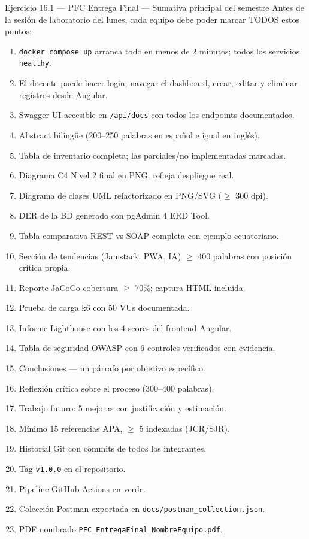 \begin{cajaejercicio}{Ejercicio 16.1 --- PFC Entrega Final --- Sumativa principal del semestre}
Antes de la sesión de laboratorio del lunes, cada equipo debe poder
marcar TODOS estos puntos:

\begin{enumerate}
\item \texttt{docker compose up} arranca todo en menos de 2 minutos;
todos los servicios \texttt{healthy}.
\item El docente puede hacer login, navegar el dashboard, crear,
editar y eliminar registros desde Angular.
\item Swagger UI accesible en \texttt{/api/docs} con todos los
endpoints documentados.
\item Abstract bilingüe (200--250 palabras en español e igual en
inglés).
\item Tabla de inventario completa; las parciales/no implementadas
marcadas.
\item Diagrama C4 Nivel 2 final en PNG, refleja despliegue real.
\item Diagrama de clases UML refactorizado en PNG/SVG ($\geq$ 300 dpi).
\item DER de la BD generado con pgAdmin 4 ERD Tool.
\item Tabla comparativa REST vs SOAP completa con ejemplo ecuatoriano.
\item Sección de tendencias (Jamstack, PWA, IA) $\geq$ 400 palabras
con posición crítica propia.
\item Reporte JaCoCo cobertura $\geq$ 70\%; captura HTML incluida.
\item Prueba de carga k6 con 50 VUs documentada.
\item Informe Lighthouse con los 4 scores del frontend Angular.
\item Tabla de seguridad OWASP con 6 controles verificados con
evidencia.
\item Conclusiones --- un párrafo por objetivo específico.
\item Reflexión crítica sobre el proceso (300--400 palabras).
\item Trabajo futuro: 5 mejoras con justificación y estimación.
\item Mínimo 15 referencias APA, $\geq$ 5 indexadas (JCR/SJR).
\item Historial Git con commits de todos los integrantes.
\item Tag \texttt{v1.0.0} en el repositorio.
\item Pipeline GitHub Actions en verde.
\item Colección Postman exportada en \texttt{docs/postman\_collection.json}.
\item PDF nombrado \texttt{PFC\_EntregaFinal\_NombreEquipo.pdf}.
\end{enumerate}


\end{cajaejercicio}
